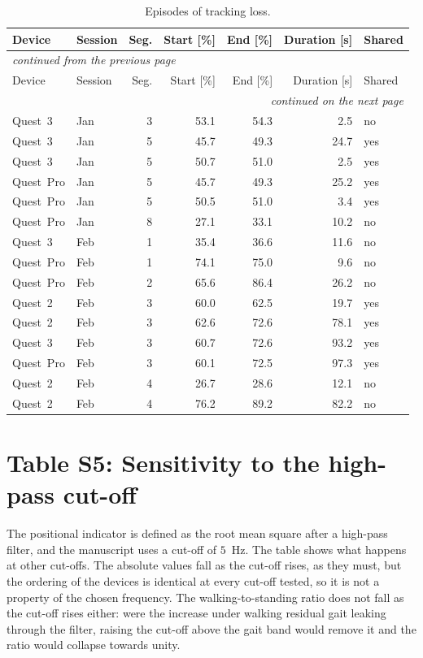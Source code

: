 \documentclass[11pt,a4paper]{article}
\begin{document}
\begin{longtable}{llrrrrl}
\caption{Episodes of tracking loss.}\label{tab:S4}\\
\toprule
Device & Session & Seg. & Start [\%] & End [\%] & Duration [s] & Shared \\
\midrule
\endfirsthead
\multicolumn{7}{l}{\footnotesize\itshape continued from the previous page}\\
\toprule
Device & Session & Seg. & Start [\%] & End [\%] & Duration [s] & Shared \\
\midrule
\endhead
\midrule
\multicolumn{7}{r}{\footnotesize\itshape continued on the next page}\\
\endfoot
\bottomrule
\endlastfoot
Quest~3 & Jan & 3 & 53.1 & 54.3 & 2.5 & no \\
Quest~3 & Jan & 5 & 45.7 & 49.3 & 24.7 & yes \\
Quest~3 & Jan & 5 & 50.7 & 51.0 & 2.5 & yes \\
Quest~Pro & Jan & 5 & 45.7 & 49.3 & 25.2 & yes \\
Quest~Pro & Jan & 5 & 50.5 & 51.0 & 3.4 & yes \\
Quest~Pro & Jan & 8 & 27.1 & 33.1 & 10.2 & no \\
Quest~3 & Feb & 1 & 35.4 & 36.6 & 11.6 & no \\
Quest~Pro & Feb & 1 & 74.1 & 75.0 & 9.6 & no \\
Quest~Pro & Feb & 2 & 65.6 & 86.4 & 26.2 & no \\
Quest~2 & Feb & 3 & 60.0 & 62.5 & 19.7 & yes \\
Quest~2 & Feb & 3 & 62.6 & 72.6 & 78.1 & yes \\
Quest~3 & Feb & 3 & 60.7 & 72.6 & 93.2 & yes \\
Quest~Pro & Feb & 3 & 60.1 & 72.5 & 97.3 & yes \\
Quest~2 & Feb & 4 & 26.7 & 28.6 & 12.1 & no \\
Quest~2 & Feb & 4 & 76.2 & 89.2 & 82.2 & no \\
\end{longtable}

\section*{Table S5: Sensitivity to the high-pass cut-off}

The positional indicator is defined as the root mean square after a high-pass filter, and the manuscript uses a cut-off of $5$~Hz. The table shows what happens at other cut-offs. The absolute values fall as the cut-off rises, as they must, but the ordering of the devices is identical at every cut-off tested, so it is not a property of the chosen frequency. The walking-to-standing ratio does not fall as the cut-off rises either: were the increase under walking residual gait leaking through the filter, raising the cut-off above the gait band would remove it and the ratio would collapse towards unity.
\end{document}
